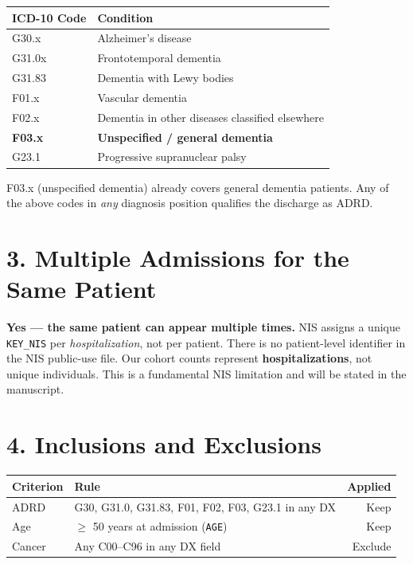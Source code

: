 \documentclass[11pt,letterpaper]{article}
\begin{document}
\begin{center}
\begin{tabular}{ll}
\toprule
\textbf{ICD-10 Code} & \textbf{Condition} \\
\midrule
G30.x  & Alzheimer's disease \\
G31.0x & Frontotemporal dementia \\
G31.83 & Dementia with Lewy bodies \\
F01.x  & Vascular dementia \\
F02.x  & Dementia in other diseases classified elsewhere \\
\textbf{F03.x} & \textbf{Unspecified / general dementia} \\
G23.1  & Progressive supranuclear palsy \\
\bottomrule
\end{tabular}
\end{center}

\noindent F03.x (unspecified dementia) already covers general dementia patients.
Any of the above codes in \emph{any} diagnosis position qualifies the discharge as ADRD.

\section*{3. Multiple Admissions for the Same Patient}

\begin{tcolorbox}[colback=lightgray, colframe=hcupblue!60]
\textbf{Yes — the same patient can appear multiple times.}
NIS assigns a unique \texttt{KEY\_NIS} per \emph{hospitalization}, not per patient.
There is no patient-level identifier in the NIS public-use file.
Our cohort counts represent \textbf{hospitalizations}, not unique individuals.
This is a fundamental NIS limitation and will be stated in the manuscript.
\end{tcolorbox}

\section*{4. Inclusions and Exclusions}

\begin{center}
\begin{tabular}{llr}
\toprule
\textbf{Criterion} & \textbf{Rule} & \textbf{Applied} \\
\midrule
ADRD     & G30, G31.0, G31.83, F01, F02, F03, G23.1 in any DX & Keep \\
Age      & $\geq$ 50 years at admission (\texttt{AGE})          & Keep \\
Cancer   & Any C00--C96 in any DX field                         & Exclude \\
\bottomrule
\end{tabular}
\end{center}
\end{document}
